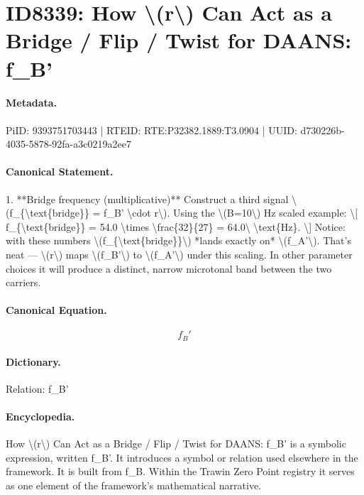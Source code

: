 \section*{ID8339: How \textbackslash{}(r\textbackslash{}) Can Act as a Bridge / Flip / Twist for DAANS: f\_B'}
\paragraph{Metadata.}
PiID: 9393751703443 | RTEID: RTE:P32382.1889:T3.0904 | UUID: d730226b-4035-5878-92fa-a3c0219a2ee7

\paragraph{Canonical Statement.}
1. **Bridge frequency (multiplicative)** Construct a third signal \textbackslash{}(f\_\{\textbackslash{}text\{bridge\}\} = f\_B' \textbackslash{}cdot r\textbackslash{}). Using the \textbackslash{}(B=10\textbackslash{}) Hz scaled example: \textbackslash{}[ f\_\{\textbackslash{}text\{bridge\}\} = 54.0 \textbackslash{}times \textbackslash{}frac\{32\}\{27\} = 64.0\textbackslash{} \textbackslash{}text\{Hz\}. \textbackslash{}] Notice: with these numbers \textbackslash{}(f\_\{\textbackslash{}text\{bridge\}\}\textbackslash{}) *lands exactly on* \textbackslash{}(f\_A'\textbackslash{}). That’s neat — \textbackslash{}(r\textbackslash{}) maps \textbackslash{}(f\_B'\textbackslash{}) to \textbackslash{}(f\_A'\textbackslash{}) under this scaling. In other parameter choices it will produce a distinct, narrow microtonal band between the two carriers.

\paragraph{Canonical Equation.}
\[
f_B'
\]

\paragraph{Dictionary.}
Relation: f\_B'

\paragraph{Encyclopedia.}
How \textbackslash{}(r\textbackslash{}) Can Act as a Bridge / Flip / Twist for DAANS: f\_B' is a symbolic expression, written f\_B'. It introduces a symbol or relation used elsewhere in the framework. It is built from f\_B. Within the Trawin Zero Point registry it serves as one element of the framework's mathematical narrative.
